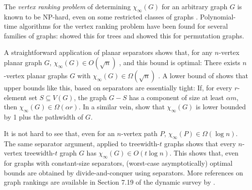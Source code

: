 \documentclass[kpfonts]{patmorin}
\theoremstyle{named}
\begin{document}
The \emph{vertex ranking problem} of determining $\chi_\infty(G)$ for an arbitrary graph $G$ is known to be NP-hard, even on some restricted classes of graphs \cite{bodlaender.deogun.ea:rankings,llewellyn.tovey.ea:local,llewellyn.tovey.ea:erratum,dereniowski.nadolski:vertex}. Polynomial-time algorithms for the vertex ranking problem have been found for several families of graphs: \citet{schaeffer:optimal} showed this for trees and \citet{deogun.kloks.ea:on} showed this for permutation graphs.

A straightforward application of planar separators shows that, for any $n$-vertex planar graph $G$, $\chi_\infty(G) \in O(\sqrt{n})$ \cite{llewellyn.tovey.ea:local,katchalski.mccuaig.ea:ordered}, and this bound is optimal:  There exists $n$-vertex planar graphs $G$ with $\chi_\infty(G)\in \Omega(\sqrt{n})$ \cite{katchalski.mccuaig.ea:ordered}.  A lower bound of \citet{katchalski.mccuaig.ea:ordered} shows that upper bounds like this, based on separators are essentially tight: If, for every $r$-element set $S\subseteq V(G)$, the graph $G-S$ has a component of size at least $\alpha m$, then $\chi_\infty(G) \in\Omega(\alpha r)$. In a similar vein, \citet{bodlaender.gilbert.ea:approximating,kloks:treewidth} show that $\chi_\infty(G)$ is lower bounded by 1 plus the pathwidth of $G$.

It is not hard to see that, even for an $n$-vertex path $P$, $\chi_\infty(P)\in\Omega(\log n)$.  The same separator argument, applied to treewidth-$t$ graphs shows that every $n$-vertex treewidth-$t$ graph $G$ has $\chi_\infty(G)\in O(t\log n)$.  This shows that, even for graphs with constant-size separators, (worst-case asymptotically) optimal bounds are obtained by divide-and-conquer using separators.  More references on graph rankings are available in Section 7.19 of the dynamic survey by \citet{gallian:dynamic}.
\end{document}
